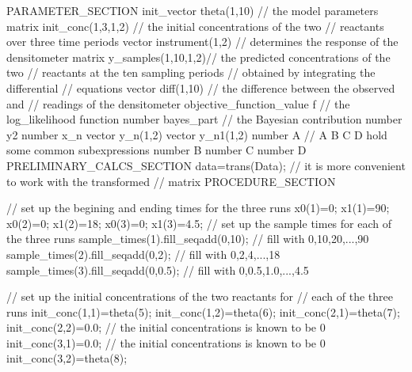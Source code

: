\documentclass[12pt]{book}
\begin{document}
PARAMETER_SECTION
  init_vector theta(1,10)   // the model parameters
  matrix init_conc(1,3,1,2) // the initial concentrations of the two
                            // reactants over three time periods
  vector instrument(1,2)    // determines the response of the densitometer
  matrix y_samples(1,10,1,2)// the predicted concentrations of the two
                            // reactants at the ten sampling periods
                            // obtained by integrating the differential
                            // equations
  vector diff(1,10)         // the difference between the observed and
                            // readings of the densitometer
  objective_function_value f  // the log_likelihood function
  number bayes_part         // the Bayesian contribution
  number y2
  number x_n
  vector y_n(1,2)
  vector y_n1(1,2)
  number A  // A B C D hold some common subexpressions
  number B
  number C
  number D
PRELIMINARY_CALCS_SECTION
  data=trans(Data);   // it is more convenient to work with the transformed
                   // matrix
PROCEDURE_SECTION

    // set up the begining and ending times for the three runs
    x0(1)=0;
    x1(1)=90;
    x0(2)=0;
    x1(2)=18;
    x0(3)=0;
    x1(3)=4.5;
    // set up the sample times for each of the three runs
    sample_times(1).fill_seqadd(0,10);  // fill with 0,10,20,...,90
    sample_times(2).fill_seqadd(0,2);   // fill with 0,2,4,...,18
    sample_times(3).fill_seqadd(0,0.5); // fill with 0,0.5,1.0,...,4.5

    // set up the initial concentrations of the two reactants for
    // each of the three runs
    init_conc(1,1)=theta(5);
    init_conc(1,2)=theta(6);
    init_conc(2,1)=theta(7);
    init_conc(2,2)=0.0;     // the initial concentrations is known to be 0
    init_conc(3,1)=0.0;     // the initial concentrations is known to be 0
    init_conc(3,2)=theta(8);
\end{document}
